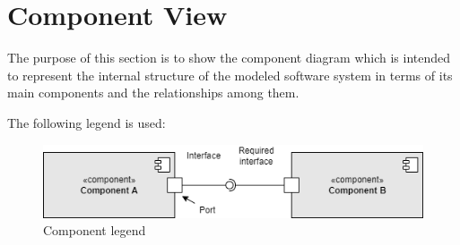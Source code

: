 \section{Component View}
The purpose of this section is to show the component diagram which is intended to represent the internal structure of the modeled software system in terms of its main components and the relationships among them.

The following legend is used:
\begin{center}
    \begin{figure}[h!]
  \includegraphics[width=\textwidth,height=\textheight,keepaspectratio]{./Images/Component legend.png}
  \caption{Component legend}
\end{figure}
\end{center}

